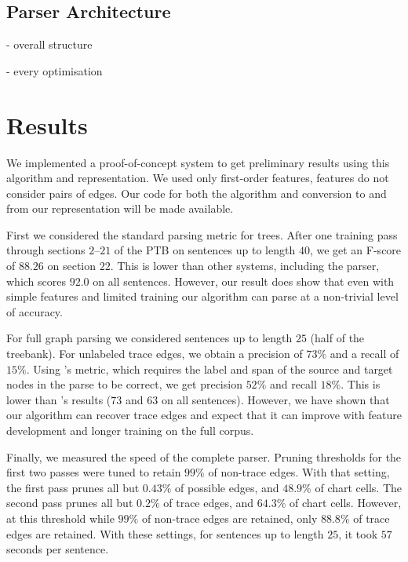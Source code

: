\subsection{Parser Architecture}

- overall structure

- every optimisation

\section{Results}

We implemented a proof-of-concept system to get preliminary results using this algorithm and representation.
We used only first-order features, \ie features do not consider pairs of edges.
Our code for both the algorithm and conversion to and from our representation will be made available.

First we considered the standard parsing metric for trees.
After one training pass through sections $2$--$21$ of the PTB on sentences up to length $40$, we get an F-score of $88.26$ on section $22$.
This is lower than other systems, including the \textcite{cck} parser, which scores $92.0$ on all sentences.
However, our result does show that even with simple features and limited training our algorithm can parse at a non-trivial level of accuracy.

For full graph parsing we considered sentences up to length $25$ (half of the treebank).
For unlabeled trace edges, we obtain a precision of $73\%$ and a recall of $15\%$.
Using \textcite{Johnson:2002}'s metric, which requires the label and span of the source and target nodes in the parse to be correct, we get precision $52\%$ and recall $18\%$.
This is lower than \textcite{Johnson:2002}'s results ($73$ and $63$ on all sentences).
However, we have shown that our algorithm can recover trace edges and expect that it can improve with feature development and longer training on the full corpus.

Finally, we measured the speed of the complete parser.
Pruning thresholds for the first two passes were tuned to retain $99\%$ of non-trace edges.
With that setting, the first pass prunes all but $0.43\%$ of possible edges, and $48.9\%$ of chart cells.
The second pass prunes all but $0.2\%$ of trace edges, and $64.3\%$ of chart cells.
However, at this threshold while $99\%$ of non-trace edges are retained, only $88.8\%$ of trace edges are retained.
With these settings, for sentences up to length $25$, it took $57$ seconds per sentence.

